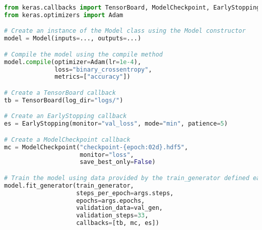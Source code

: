 \begin{lstlisting}[float={ht},caption={Use Keras Adam optimiser implementation, the Keras implementation of the binary cross-entropy loss, and the Keras accuracy metric.},label={lst:compile},language=Python,upquote=true]
from keras.callbacks import TensorBoard, ModelCheckpoint, EarlyStopping
from keras.optimizers import Adam

# Create an instance of the Model class using the Model constructor
model = Model(inputs=..., outputs=...)

# Compile the model using the compile method
model.compile(optimizer=Adam(lr=1e-4), 
              loss="binary_crossentropy",
              metrics=["accuracy"])

# Create a TensorBoard callback
tb = TensorBoard(log_dir="logs/")

# Create an EarlyStopping callback
es = EarlyStopping(monitor="val_loss", mode="min", patience=5)

# Create a ModelCheckpoint callback
mc = ModelCheckpoint("checkpoint-{epoch:02d}.hdf5",
                     monitor="loss",
                     save_best_only=False)

# Train the model using data provided by the train_generator defined earlier
model.fit_generator(train_generator, 
                    steps_per_epoch=args.steps, 
                    epochs=args.epochs,
                    validation_data=val_gen,
                    validation_steps=33,
                    callbacks=[tb, mc, es])
\end{lstlisting}